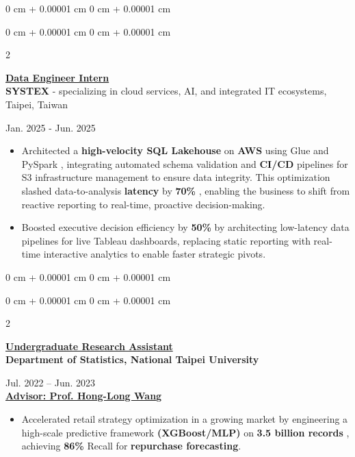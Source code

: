 \documentclass[10pt, letterpaper]{article}
\newenvironment{onecolentry}{
    \begin{adjustwidth}{
        0 cm + 0.00001 cm
    }{
        0 cm + 0.00001 cm
    }
}{
    \end{adjustwidth}
} %
\newenvironment{twocolentry}[2][]{
    \onecolentry
    \def\secondColumn{#2}
    \setcolumnwidth{\fill, 4.5 cm}
    \begin{paracol}{2}
}{
    \switchcolumn \raggedleft \secondColumn
    \end{paracol}
    \endonecolentry
} %
\begin{document}
        \vspace{0.10 cm}
        \begin{onecolentry}
            \begin{twocolentry}{
                Jan. 2025 - Jun. 2025
            }

            \textbf{\underline{Data Engineer Intern}} \\
            \textbf{SYSTEX} - specializing in cloud services, AI, and integrated IT ecosystems, Taipei, Taiwan

            \end{twocolentry}
            
            \begin{itemize}
                \item Architected a \textbf{high-velocity SQL Lakehouse} on \textbf{AWS} using Glue and PySpark , integrating automated schema validation and \textbf{CI/CD} pipelines for S3 infrastructure management to ensure data integrity. This optimization slashed data-to-analysis \textbf{latency} by \textbf{70\%} , enabling the business to shift from reactive reporting to real-time, proactive decision-making.
                \item Boosted executive decision efficiency by \textbf{50\% } by architecting low-latency data pipelines for live Tableau dashboards, replacing static reporting with real-time interactive analytics to enable faster strategic pivots. 
            
                \end{itemize}
        \end{onecolentry}


    \begin{onecolentry}
        \begin{twocolentry}{
            Jul. 2022 – Jun. 2023 \\
            \underline{\textbf{Advisor: Prof. Hong-Long Wang}}
        }
        \textbf{\underline{Undergraduate Research Assistant}} \\
        \textbf{Department of Statistics, National Taipei University}
        \end{twocolentry}
        
        \begin{itemize}

            \item Accelerated retail strategy optimization in a growing market by engineering a high-scale predictive framework \textbf{(XGBoost/MLP)} on \textbf{3.5 billion records} , achieving \textbf{86\%} Recall for \textbf{repurchase forecasting}.


        \end{itemize}


    \end{onecolentry}
\end{document}
